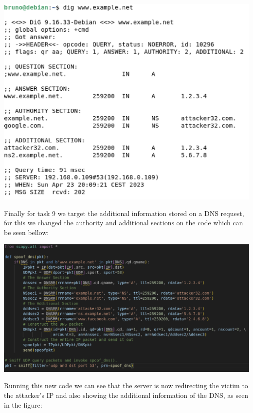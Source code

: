 \documentclass{article}
\begin{document}
\begin{center}
  \includegraphics[scale=0.5]{images/Task8.png}
\end{center}

Finally for task 9 we target the additional information stored on a DNS request, for this we changed the authority and additional sections on the code which can be seen bellow:

\begin{center}
  \includegraphics[scale=0.5]{images/Task9-code.png}
\end{center}

Running this new code we can see that the server is now redirecting the victim to the attacker's IP and also showing the additional information of the DNS, as seen in the figure:
\end{document}
